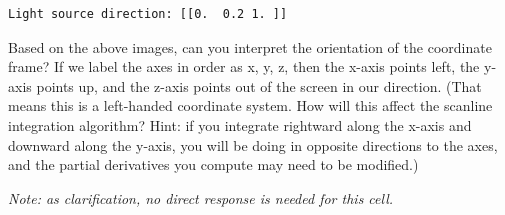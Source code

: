 \documentclass[11pt]{article}
\begin{document}
    \begin{Verbatim}[commandchars=\\\{\}]
Light source direction: [[0.  0.2 1. ]]
\end{Verbatim}

    Based on the above images, can you interpret the orientation of the
coordinate frame? If we label the axes in order as x, y, z, then the
x-axis points left, the y-axis points up, and the z-axis points out of
the screen in our direction. (That means this is a left-handed
coordinate system. How will this affect the scanline integration
algorithm? Hint: if you integrate rightward along the x-axis and
downward along the y-axis, you will be doing in opposite directions to
the axes, and the partial derivatives you compute may need to be
modified.)

\emph{Note: as clarification, no direct response is needed for this
cell.}
\end{document}
